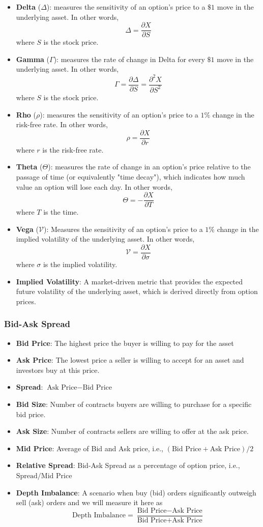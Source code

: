 \documentclass[oneside, 12pt]{article}
\newcommand*{\1}{\text{\scalebox{1.1}{\usefont{U}{bbold}{m}{n}1}}}
\begin{document}
\begin{itemize}
\item \textbf{Delta} ($\Delta$): measures the sensitivity of an option's price to a $\$1$ move in the underlying asset. In other words,
$$
\Delta = \frac{\partial X}{\partial S}
$$
where $S$ is the stock price. 
\item \textbf{Gamma} ($\Gamma$): measures the rate of change in Delta for every $\$1$ move in the underlying asset. In other words,
$$
\Gamma = \frac{\partial \Delta}{\partial S} = \frac{\partial^2 X}{\partial S^2}
$$
where $S$ is the stock price. 
\item \textbf{Rho} ($\rho$): measures the sensitivity of an option's price to a $1\%$ change in the risk-free rate. In other words,
$$
\rho = \frac{\partial X}{\partial r}
$$
where $r$ is the risk-free rate.
\item \textbf{Theta} ($\Theta$): measures the rate of change in an option's price relative to the passage of time (or equivalently "time decay"), which indicates how much value an option will lose each day. In other words,
$$
\Theta = -\frac{\partial X}{\partial T}
$$
where $T$ is the time. 
\item \textbf{Vega} ($\mathcal{V}$): Measures the sensitivity of an option's price to a $1\%$ change in the implied volatility of the underlying asset. In other words,
$$
\mathcal{V} = \frac{\partial X}{\partial \sigma}
$$
where $\sigma$ is the implied volatility. 
\item \textbf{Implied Volatility}: A market-driven metric that provides the expected future volatility of the underlying asset, which is derived directly from option prices. 
\end{itemize}

\subsubsection{Bid-Ask Spread}
\begin{itemize}
\item \textbf{Bid Price}: The highest price the buyer is willing to pay for the asset
\item \textbf{Ask Price}: The lowest price a seller is willing to accept for an asset and investors buy at this price.
\item \textbf{Spread}: $\text{Ask Price} - \text{Bid Price}$
\item \textbf{Bid Size}: Number of contracts buyers are willing to purchase for a specific bid price. 
\item \textbf{Ask Size}: Number of contracts sellers are willing to offer at the ask price. 
\item \textbf{Mid Price}: Average of Bid and Ask price, i.e., $(\text{Bid Price} + \text{Ask Price})/2$
\item \textbf{Relative Spread}: Bid-Ask Spread as a percentage of option price, i.e., $\text{Spread}/\text{Mid Price}$
\item \textbf{Depth Imbalance}: A scenario when buy (bid) orders significantly outweigh sell (ask) orders and we will measure it here as 
$$
\text{Depth Imbalance} = \frac{\text{Bid Price} - \text{Ask Price}}{\text{Bid Price} + \text{Ask Price}}
$$
\end{itemize}
\end{document}
